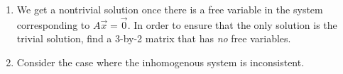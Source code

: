 \begin{enumerate}
	\item We get a nontrivial solution once there is a free variable in the system corresponding to \(A\vec{x} = \vec{0}\). In order to ensure that the only solution is the
		trivial solution, find a 3-by-2 matrix that has \emph{no} free variables.
	
	\item Consider the case where the inhomogenous system is inconsistent.
\end{enumerate}